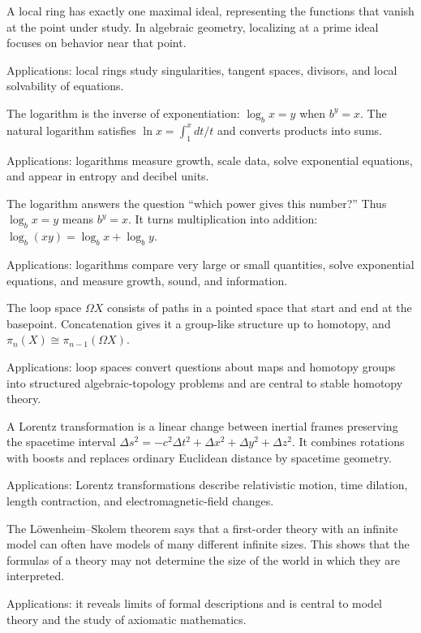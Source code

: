 A local ring has exactly one maximal ideal, representing the functions that vanish at the point under study. In algebraic geometry, localizing at a prime ideal focuses on behavior near that point. \par\noindent Applications: local rings study singularities, tangent spaces, divisors, and local solvability of equations.

The logarithm is the inverse of exponentiation: $\log_bx=y$ when $b^y=x$. The natural logarithm satisfies $\ln x=\int_1^xdt/t$ and converts products into sums. \par\noindent Applications: logarithms measure growth, scale data, solve exponential equations, and appear in entropy and decibel units.

The logarithm answers the question “which power gives this number?” Thus $\log_b x=y$ means $b^y=x$. It turns multiplication into addition: $\log_b(xy)=\log_bx+\log_by$. \par\noindent Applications: logarithms compare very large or small quantities, solve exponential equations, and measure growth, sound, and information.

The loop space $\Omega X$ consists of paths in a pointed space that start and end at the basepoint. Concatenation gives it a group-like structure up to homotopy, and $\pi_n(X)\cong\pi_{n-1}(\Omega X)$. \par\noindent Applications: loop spaces convert questions about maps and homotopy groups into structured algebraic-topology problems and are central to stable homotopy theory.

A Lorentz transformation is a linear change between inertial frames preserving the spacetime interval $\Delta s^2=-c^2\Delta t^2+\Delta x^2+\Delta y^2+\Delta z^2$. It combines rotations with boosts and replaces ordinary Euclidean distance by spacetime geometry. \par\noindent Applications: Lorentz transformations describe relativistic motion, time dilation, length contraction, and electromagnetic-field changes.

The Löwenheim--Skolem theorem says that a first-order theory with an infinite model can often have models of many different infinite sizes. This shows that the formulas of a theory may not determine the size of the world in which they are interpreted. \par\noindent Applications: it reveals limits of formal descriptions and is central to model theory and the study of axiomatic mathematics.

